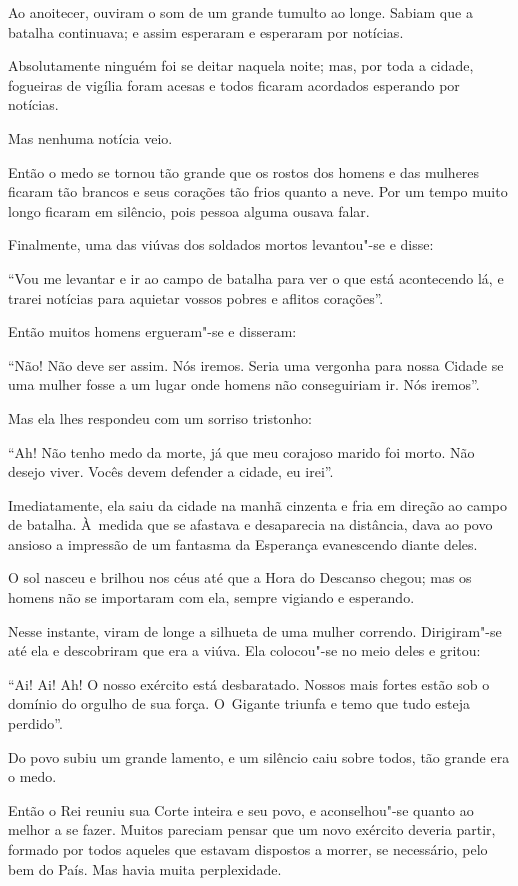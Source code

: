 Ao anoitecer, ouviram o som de um grande tumulto ao longe. Sabiam que a
batalha continuava; e assim esperaram e esperaram por notícias.

Absolutamente ninguém foi se deitar naquela noite; mas, por toda a
cidade, fogueiras de vigília foram acesas e todos ficaram acordados
esperando por notícias.

Mas nenhuma notícia veio.

Então o medo se tornou tão grande que os rostos dos homens e das
mulheres ficaram tão brancos e seus corações tão frios quanto a neve.
Por um tempo muito longo ficaram em silêncio, pois pessoa alguma ousava
falar.

Finalmente, uma das viúvas dos soldados mortos levantou"-se e disse:

``Vou me levantar e ir ao campo de batalha para ver o que está
acontecendo lá, e trarei notícias para aquietar vossos pobres e aflitos
corações''.

Então muitos homens ergueram"-se e disseram:

``Não! Não deve ser assim. Nós iremos. Seria uma vergonha para nossa
Cidade se uma mulher fosse a um lugar onde homens não conseguiriam ir.
Nós iremos''.

Mas ela lhes respondeu com um sorriso tristonho:

``Ah! Não tenho medo da morte, já que meu corajoso marido foi morto. Não
desejo viver. Vocês devem defender a cidade, eu irei''.

Imediatamente, ela saiu da cidade na manhã cinzenta e fria em direção ao
campo de batalha. À~medida que se afastava e desaparecia na distância,
dava ao povo ansioso a impressão de um fantasma da Esperança evanescendo
diante deles.

O sol nasceu e brilhou nos céus até que a Hora do Descanso chegou; mas
os homens não se importaram com ela, sempre vigiando e esperando.

Nesse instante, viram de longe a silhueta de uma mulher correndo.
Dirigiram"-se até ela e descobriram que era a viúva. Ela colocou"-se no
meio deles e gritou:

``Ai! Ai! Ah! O nosso exército está desbaratado. Nossos mais fortes
estão sob o domínio do orgulho de sua força. O~Gigante triunfa e temo
que tudo esteja perdido''.

Do povo subiu um grande lamento, e um silêncio caiu sobre todos, tão
grande era o medo.

Então o Rei reuniu sua Corte inteira e seu povo, e aconselhou"-se quanto
ao melhor a se fazer. Muitos pareciam pensar que um novo exército
deveria partir, formado por todos aqueles que estavam dispostos a
morrer, se necessário, pelo bem do País. Mas havia muita perplexidade.

